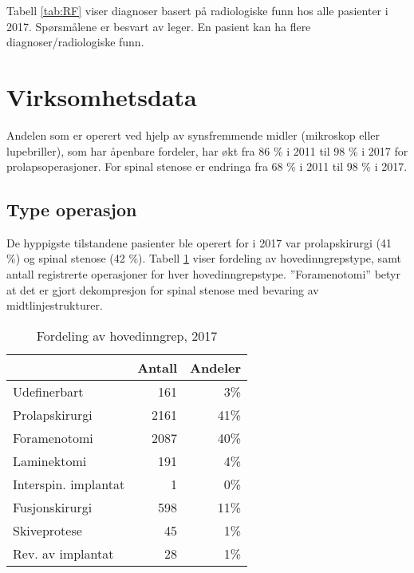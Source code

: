 \documentclass [norsk,a4paper,twoside]{article}\usepackage[]{graphicx}\usepackage[]{color}
\begin{document}
Tabell \ref{tab:RF} viser diagnoser basert på radiologiske funn hos alle pasienter 
i 2017. 
Spørsmålene er besvart av leger.
En pasient kan ha flere diagnoser/radiologiske funn.




\section{Virksomhetsdata}

Andelen som er operert ved hjelp av synsfremmende midler (mikroskop eller
lupebriller), som har åpenbare fordeler, har økt fra 86 \% i 2011 til 
98 \% i 2017 for prolapsoperasjoner. 
For spinal stenose er endringa fra 68 \% i 2011 til 
98 \% i 2017.



\subsection{Type operasjon}



De hyppigste tilstandene pasienter ble operert for i 2017 var prolapskirurgi (41 \%) og spinal stenose (42 \%). Tabell \ref{tab:AntHovedInngrep} viser fordeling av hovedinngrepstype, samt antall registrerte operasjoner for hver hovedinngrepstype.
''Foramenotomi'' betyr at det er gjort dekompresjon for spinal stenose med bevaring av midtlinjestrukturer.

\begin{table}[ht]
\centering
\begin{tabular}{lrr}
  \hline
 & Antall & Andeler \\ 
  \hline
Udefinerbart & 161 & 3\% \\ 
  Prolapskirurgi & 2161 & 41\% \\ 
  Foramenotomi & 2087 & 40\% \\ 
  Laminektomi & 191 & 4\% \\ 
  Interspin. implantat & 1 & 0\% \\ 
  Fusjonskirurgi & 598 & 11\% \\ 
  Skiveprotese & 45 & 1\% \\ 
  Rev. av implantat & 28 & 1\% \\ 
   \hline
\end{tabular}
\caption{Fordeling av hovedinngrep, 2017} 
\label{tab:AntHovedInngrep}
\end{table}
\end{document}
